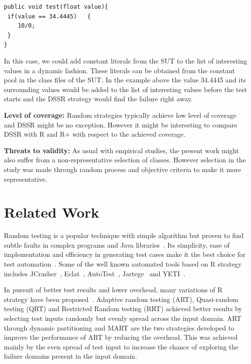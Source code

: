 \begin{lstlisting}
public void test(float value){
 if(value == 34.4445)   {
 	10/0;
 }
}
\end{lstlisting}

In this case, we could add constant literals from the SUT to the list of interesting values in a dynamic fashion. These literals can be obtained from the constant pool in the class files of the SUT. In the example above the value 34.4445 and its surrounding values would  be added to the list of interesting values before the test starts and the DSSR strategy would find the failure right away.

\textbf{Level of coverage:} Random strategies typically achieve low level of coverage~\cite{oriol2010yeti} and DSSR might be no exception. However it might be interesting to compare DSSR with R and R+ with respect to the achieved coverage.

\textbf{Threats to validity:} As usual with empirical studies, the present work might also suffer from a non-representative selection of classes. However selection in the study was made through random process and objective criteria to make it more representative.




\section{Related Work}\label{sec:rw}

Random testing is a popular technique with simple algorithm but proven to find subtle faults in complex programs and Java libraries~\cite{csallner2004jcrasher, pacheco2005eclat,claessen2011quickcheck}. Its simplicity, ease of implementation and efficiency in generating test cases make it the best choice for test automation~\cite{hamlet1994random}. Some of the well known automated tools based on R strategy includes JCrasher~\cite{csallner2004jcrasher}, Eclat~\cite{pacheco2005eclat}, AutoTest~\cite{ciupa2007experimental, ciupa2008artoo}, Jartege~\cite{oriat2005jartege} and YETI~\cite{oriol2010yeti, oriol2012random}.

In pursuit of better test results and lower overhead, many variations of R strategy have been proposed~\cite{chen2004mirror, chen2007quasi, chen2010adaptive, chan2006restricted, chen2004adaptive}. Adaptive random testing (ART), Quasi-random testing (QRT) and Restricted Random testing (RRT) achieved better results by selecting test inputs randomly but evenly spread across the input domain. ART through dynamic partitioning and MART are the two strategies developed to improve the performance of ART by reducing the overhead. This was achieved mainly by the even spread of test input to increase the chance of exploring the failure domains present in the input domain.

